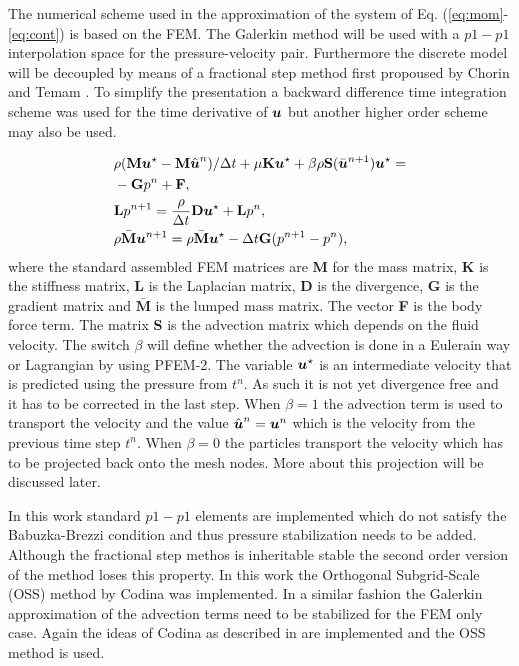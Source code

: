 The numerical scheme used in the approximation of the system of Eq. (\ref{eq:mom}-\ref{eq:cont}) is based on the FEM. The Galerkin method will be used with a $p1-p1$ interpolation space for the pressure-velocity pair. Furthermore the discrete model will be decoupled by means of a fractional step method first propoused by Chorin \cite{chorin} and Temam \cite{temam}. To simplify the presentation a backward difference time integration scheme was used for the time derivative of $\boldsymbol{u}$ but another higher order scheme may also be used. 

\begin{align}\label{eq:masamat}
&\rho (\textbf{M}\boldsymbol{u}^\star-\textbf{M}\hat{\boldsymbol{u}}^n)/\Delta t+\mu\textbf{K}\boldsymbol{u}^{\star} +\beta\rho\textbf{S}(\bar{\boldsymbol{u}}^{n+1})\boldsymbol{u}^{\star}  = \nonumber\\&-\textbf{G}p^n+ \textbf{F},
\\\label{eq:matpres2}
& \textbf{L}p^{n+1}=\frac{\rho}{\Delta t}\textbf{D}\boldsymbol{u}^\star+ \textbf{L}  p^{n},
\\\label{eq:matunm2}
&\rho \bar{\textbf{M}}\boldsymbol{u}^{n+1}=\rho \bar{\textbf{M}}\boldsymbol{u}^\star-\Delta t\textbf{G}(p^{n+1}- p^n),
\end{align}
where the standard assembled FEM matrices are \textbf{M} for the mass matrix, \textbf{K} is the stiffness matrix, \textbf{L} is the Laplacian matrix, \textbf{D} is the divergence, \textbf{G} is the gradient matrix and $\bar{\textbf{M}}$ is the lumped mass matrix. The vector \textbf{F} is the body force term. The matrix \textbf{S} is the advection matrix which depends on the fluid velocity. The switch $\beta$ will define whether the advection is done in a Eulerain way or Lagrangian by using PFEM-2. The variable $\boldsymbol{u}^\star$ is an intermediate velocity that is predicted using the pressure from $t^n$. As such it is not yet divergence free and it has to be corrected in the last step. When $\beta=1$ the advection term is used to transport the velocity and the value $\hat{\boldsymbol{u}}^n=\boldsymbol{u}^n$ which is the velocity from the previous time step $t^n$. When $\beta=0$ the particles transport the velocity which has to be projected back onto the mesh nodes. More about this projection will be discussed later.

In this work standard $p1-p1$ elements are implemented which do not satisfy the Babuzka-Brezzi condition and thus pressure stabilization needs to be added. Although the fractional step methos is inheritable stable the second order version of the method loses this property. In this work the Orthogonal Subgrid-Scale (OSS) method by Codina \cite{codina-oss-press} was implemented. In a similar fashion the Galerkin approximation of the advection terms need to be stabilized for the FEM only case. Again the ideas of Codina as described in \cite{codina-soto} are implemented and the OSS method is used. 
